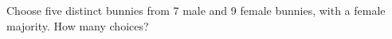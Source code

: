 Choose five distinct bunnies from 7 male and 9 female bunnies, with a female majority. How many choices?
